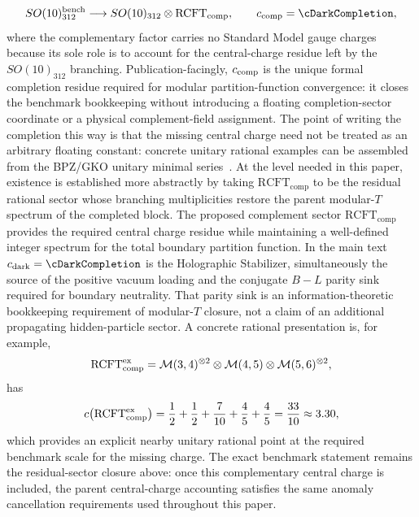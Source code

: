 \documentclass[11pt]{article}
\begin{document}
\begin{equation}
 SO(10)_{312}^{\rm bench}
 \longrightarrow
 SO(10)_{312}\otimes {\rm RCFT}_{\rm comp},
 \qquad
 c_{\rm comp}=\cDarkCompletion,
\end{equation}
where the complementary factor carries no Standard Model gauge charges because
its sole role is to account for the central-charge residue left by the
$SO(10)_{312}$ branching. Publication-facingly, $c_{\rm comp}$ is the unique
formal completion residue required for modular partition-function convergence:
it closes the benchmark bookkeeping without introducing a floating
completion-sector coordinate or a physical complement-field assignment. The point
of writing the completion this way is that the missing central charge need not
be treated as an arbitrary floating constant: concrete unitary rational
examples can be assembled from the BPZ/GKO unitary minimal series~\cite{bpz1984,gko1985}. At the level needed in this paper, existence is established more abstractly by taking $\mathrm{RCFT}_{\mathrm{comp}}$ to be the residual rational sector whose branching multiplicities restore the parent modular-$T$ spectrum of the completed block. The proposed complement sector $\mathrm{RCFT}_{\mathrm{comp}}$ provides the required central charge residue while maintaining a well-defined integer spectrum for the total boundary partition function. In the main text $c_{\rm dark}=\cDarkCompletion$ is the Holographic Stabilizer, simultaneously the source of the positive vacuum loading and the conjugate $B-L$ parity sink required for boundary neutrality. That parity sink is an information-theoretic bookkeeping requirement of modular-$T$ closure, not a claim of an additional propagating hidden-particle sector. A concrete rational presentation is, for example,
\begin{equation}
 {\rm RCFT}_{\rm comp}^{\rm ex}
 = \mathcal M(3,4)^{\otimes 2}\otimes \mathcal M(4,5)\otimes \mathcal M(5,6)^{\otimes 2},
\end{equation}
has
\begin{equation}
 c\bigl({\rm RCFT}_{\rm comp}^{\rm ex}\bigr)
 = \frac12+\frac12+\frac{7}{10}+\frac45+\frac45
 = \frac{33}{10}
 \approx 3.30,
\end{equation}
which provides an explicit nearby unitary rational point at the required benchmark scale for the missing charge. The exact benchmark statement remains the residual-sector closure above: once this complementary central charge is included, the parent central-charge accounting satisfies the same anomaly cancellation requirements used throughout this paper.
\end{document}
